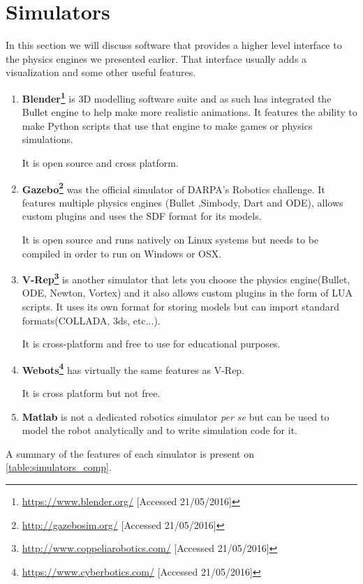 \section{Simulators}
In this section we will discuss software that provides a higher level interface to the physics engines we presented earlier. That interface usually adds a visualization and some other useful features.
\begin{enumerate}

\item \textbf{Blender\footnote{\url{https://www.blender.org/} [Accessed 21/05/2016]}} is 3D modelling software suite and as such has integrated the Bullet engine to help make more realistic animations. It features the ability to make Python scripts that use that engine to make games or physics simulations. 

It is open source and cross platform.

\item \textbf{Gazebo\footnote{\url{http://gazebosim.org/} [Accessed 21/05/2016]}} was the official simulator of DARPA's Robotics challenge. It features multiple physics engines (Bullet ,Simbody, Dart and ODE), allows custom plugins and uses the SDF format for its models. 

It is open source and runs natively on Linux systems but needs to be compiled in order to run on Windows or OSX.

\item \textbf{V-Rep\footnote{\url{http://www.coppeliarobotics.com/} [Accessed 21/05/2016]}} is another simulator that lets you choose the physics engine(Bullet, ODE, Newton, Vortex) and it also allows custom plugins in the form of LUA scripts. It uses its own format for storing models but can import standard formats(COLLADA, 3ds, etc...).

It is cross-platform and free to use for educational purposes.

\item \textbf{Webots\footnote{\url{https://www.cyberbotics.com/} [Accessed 21/05/2016]}} has virtually the same features as V-Rep.

It is cross platform but not free.

\item \textbf{Matlab} is not a dedicated robotics simulator \textit{per se} but can be used to model the robot analytically and to write simulation code for it. 
\end{enumerate}

A summary of the features of each simulator is present on \cref{table:simulators_comp}.

